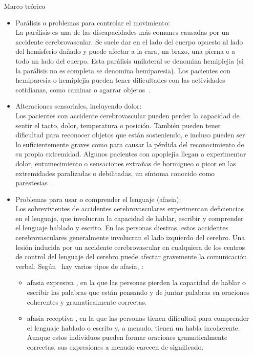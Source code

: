 \begin{thesischapter}{1} {Marco teórico}
    \begin{itemize}
        \item Parálisis o problemas para controlar el movimiento: \\
        La parálisis es una de las discapacidades más comunes causadas por un accidente cerebrovascular. Se suele dar en el lado del cuerpo opuesto al lado del hemisferio   dañado y puede afectar a la cara, un brazo, una pierna o a todo un lado del cuerpo. Esta parálisis unilateral se denomina hemiplejia (si la parálisis no es completa se denomina hemiparesia). Los pacientes con hemiparesia o hemiplejia pueden tener dificultades con las actividades cotidianas, como caminar o agarrar objetos~\cite{cuidadosalpacienteadulto}.
        \item Alteraciones sensoriales, incluyendo dolor:\\
        Los pacientes con accidente cerebrovascular pueden perder la capacidad de sentir el tacto, dolor, temperatura o posición. También pueden tener dificultad para reconocer
        objetos que están sosteniendo, e incluso pueden ser lo suficientemente graves como para causar la pérdida del reconocimiento de su propia extremidad. Algunos pacientes con
        apoplejía llegan a experimentar dolor, entumecimiento o sensaciones extrañas de hormigueo o picor en las extremidades paralizadas o debilitadas, un síntoma conocido
        como parestesias~\cite{post-strok}.
        \item Problemas para usar o comprender el lenguaje (afasia):\\
        Los sobrevivientes de accidentes cerebrovasculares experimentan deficiencias en el lenguaje, que involucran la capacidad de hablar, escribir y comprender el lenguaje hablado y escrito. 
        En las personas diestras, estos accidentes cerebrovasculares generalmente involucran el lado izquierdo del cerebro. Una lesión inducida por un accidente cerebrovascular en cualquiera de los centros de control del lenguaje del cerebro puede afectar gravemente la comunicación verbal. 
        Según~\cite{post-strok} hay varios tipos de afasia, :
        \begin{itemize}
            \item afasia expresiva , en la que las personas pierden la capacidad de hablar o escribir las palabras que están pensando y de juntar palabras en oraciones coherentes y gramaticalmente correctas.
            \item afasia receptiva , en la que las personas tienen dificultad para comprender el lenguaje hablado o escrito y, a menudo, tienen un habla incoherente. Aunque estos individuos pueden formar oraciones gramaticalmente correctas, sus expresiones a menudo carecen de significado.

\end{itemize}
\end{itemize}
\end{thesischapter}
